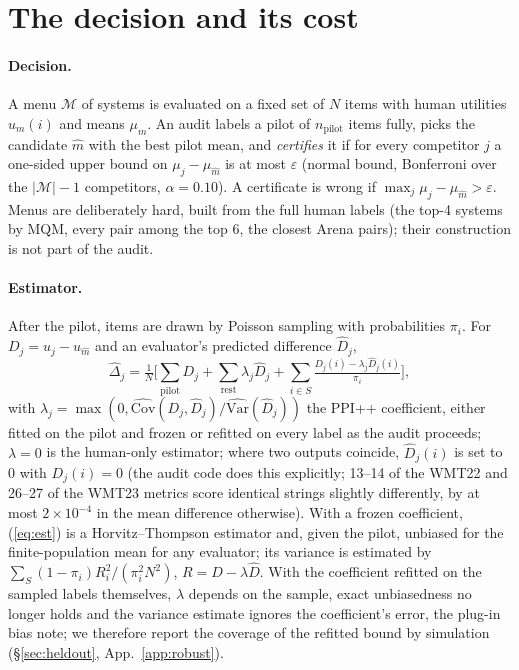 \documentclass[11pt]{article}
\newcommand{\eps}{\varepsilon}
\newcommand{\np}{n_{\mathrm{pilot}}}
\begin{document}
\section{The decision and its cost}\label{sec:setup}
\paragraph{Decision.} A menu $\mathcal M$ of systems is evaluated on a fixed set of $N$ items with human utilities
$u_m(i)$ and means $\mu_m$. An audit labels a pilot of $\np$ items fully, picks the candidate $\hat m$ with the best pilot
mean, and \emph{certifies} it if for every competitor $j$ a one-sided upper bound on $\mu_j-\mu_{\hat m}$ is at most
$\eps$ (normal bound, Bonferroni over the $|\mathcal M|-1$ competitors, $\alpha=0.10$). A certificate is wrong if
$\max_j\mu_j-\mu_{\hat m}>\eps$. Menus are deliberately hard, built from the full human labels (the top-4 systems by
MQM, every pair among the top 6, the closest Arena pairs); their construction is not part of the audit.

\paragraph{Estimator.} After the pilot, items are drawn by Poisson sampling with probabilities $\pi_i$. For
$D_j=u_j-u_{\hat m}$ and an evaluator's predicted difference $\hat D_j$,
\begin{equation}
\hat\Delta_j=\tfrac1N\Big[\sum_{\text{pilot}}D_j+\sum_{\text{rest}}\lambda_j\hat D_j+\sum_{i\in S}\tfrac{D_j(i)-\lambda_j\hat D_j(i)}{\pi_i}\Big],\label{eq:est}
\end{equation}
with $\lambda_j=\max(0,\widehat{\mathrm{Cov}}(D_j,\hat D_j)/\widehat{\mathrm{Var}}(\hat D_j))$ the PPI++ coefficient,
either fitted on the pilot and frozen or refitted on every label as the audit proceeds; $\lambda=0$ is the human-only
estimator; where two outputs coincide, $\hat D_j(i)$ is set to 0 with $D_j(i)=0$ (the audit code does this
explicitly; 13--14 of the WMT22 and 26--27 of the WMT23 metrics score identical strings slightly differently, by at
most $2\times10^{-4}$ in the mean difference otherwise). With a frozen coefficient, (\ref{eq:est}) is a
Horvitz--Thompson estimator \citep{horvitz1952} and, given the pilot, unbiased for the finite-population mean for any
evaluator; its variance is estimated by $\sum_S(1-\pi_i)R_i^2/(\pi_i^2N^2)$, $R=D-\lambda\hat D$. With the
coefficient refitted on the sampled labels themselves, $\lambda$ depends on the sample, exact unbiasedness no longer
holds and the variance estimate ignores the coefficient's error, the plug-in bias \citet{chaganty2018price} note; we
therefore report the coverage of the refitted bound by simulation (\S\ref{sec:heldout}, App.~\ref{app:robust}).
\end{document}
